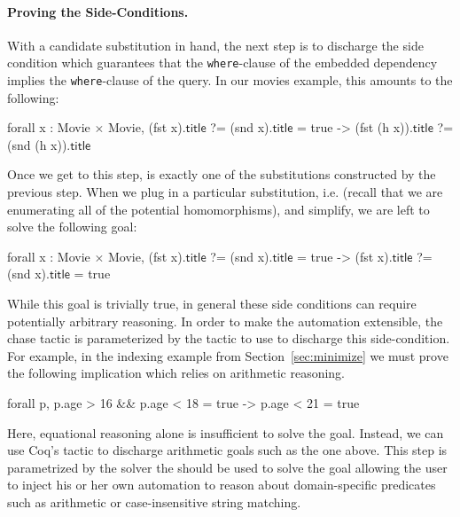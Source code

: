 \documentclass[preprint]{sigplanconf}
\newcommand{\ltac}[0]{\ensuremath{\mathcal{L}_{\mathrm{tac}}}}
\begin{document}
\paragraph{Proving the Side-Conditions.}
With a candidate substitution in hand, the next step is to discharge the side condition which guarantees that the {\tt where}-clause of the embedded dependency implies the {\tt where}-clause of the query.
In our movies example, this amounts to the following: %
\begin{coq}
forall x : Movie $\times$ Movie, (fst x).$\textsf{title}$ ?= (snd x).$\textsf{title}$ = true
     -> (fst (h x)).$\textsf{title}$ ?= (snd (h x)).$\textsf{title}$
\end{coq}

Once we get to this step,  is exactly one of the substitutions constructed by the previous step.
When we plug in a particular substitution, i.e.  (recall that we are enumerating all of the potential homomorphisms), and simplify, we are left to solve the following goal: %
\begin{coq}
forall x : Movie $\times$ Movie, (fst x).$\textsf{title}$ ?= (snd x).$\textsf{title}$ = true
     -> (fst x).$\textsf{title}$ ?= (snd x).$\textsf{title}$ = true
\end{coq}

While this goal is trivially true, in general these side conditions can require potentially arbitrary reasoning.
In order to make the automation extensible, the chase tactic is parameterized by the tactic to use to discharge this side-condition.
For example, in the indexing example from Section~\ref{sec:minimize} we must prove the following implication which relies on arithmetic reasoning.
\begin{coq}
forall p, p.age > 16 && p.age < 18 = true ->
          p.age < 21 = true
\end{coq}
Here, equational reasoning alone is insufficient to solve the goal.
Instead, we can use Coq's  tactic to discharge arithmetic goals such as the one above.
This step is parametrized by the solver the should be used to solve the goal allowing the user to inject his or her own automation to reason about domain-specific predicates such as arithmetic or case-insensitive string matching.
\end{document}

